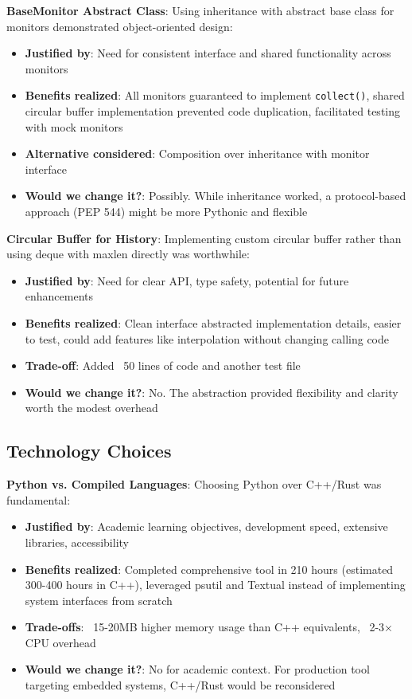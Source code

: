 \documentclass[12pt,a4paper,oneside]{report}
\begin{document}
\textbf{BaseMonitor Abstract Class}: Using inheritance with abstract base class for monitors demonstrated object-oriented design:

\begin{itemize}
    \item \textbf{Justified by}: Need for consistent interface and shared functionality across monitors
    \item \textbf{Benefits realized}: All monitors guaranteed to implement \texttt{collect()}, shared circular buffer implementation prevented code duplication, facilitated testing with mock monitors
    \item \textbf{Alternative considered}: Composition over inheritance with monitor interface
    \item \textbf{Would we change it?}: Possibly. While inheritance worked, a protocol-based approach (PEP 544) might be more Pythonic and flexible
\end{itemize}

\textbf{Circular Buffer for History}: Implementing custom circular buffer rather than using deque with maxlen directly was worthwhile:

\begin{itemize}
    \item \textbf{Justified by}: Need for clear API, type safety, potential for future enhancements
    \item \textbf{Benefits realized}: Clean interface abstracted implementation details, easier to test, could add features like interpolation without changing calling code
    \item \textbf{Trade-off}: Added ~50 lines of code and another test file
    \item \textbf{Would we change it?}: No. The abstraction provided flexibility and clarity worth the modest overhead
\end{itemize}

\subsection{Technology Choices}

\textbf{Python vs. Compiled Languages}: Choosing Python over C++/Rust was fundamental:

\begin{itemize}
    \item \textbf{Justified by}: Academic learning objectives, development speed, extensive libraries, accessibility
    \item \textbf{Benefits realized}: Completed comprehensive tool in 210 hours (estimated 300-400 hours in C++), leveraged psutil and Textual instead of implementing system interfaces from scratch
    \item \textbf{Trade-offs}: ~15-20MB higher memory usage than C++ equivalents, ~2-3× CPU overhead
    \item \textbf{Would we change it?}: No for academic context. For production tool targeting embedded systems, C++/Rust would be reconsidered
\end{itemize}
\end{document}
